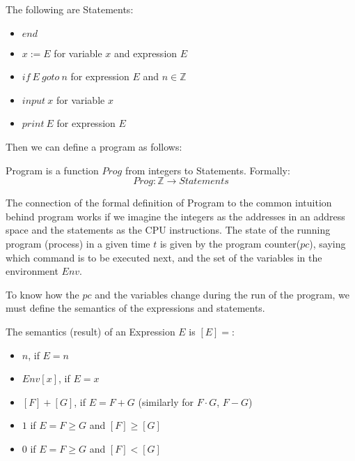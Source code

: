 \begin{defn}[Statement]
    The following are Statements:
    \begin{itemize}
        \item $end$
        \item $x := E$ for variable $x$ and expression $E$
        \item $if \: E \: goto \: n$ for expression $E$ and $n \in \mathbb{Z}$
        \item $input \: x$ for variable $x$
        \item $print \: E$ for expression $E$
    \end{itemize}
\end{defn}

Then we can define a program as follows:

\begin{defn}[Program]
    Program is a function $Prog$ from integers to Statements.
    Formally:
    \[Prog: \mathbb{Z} \rightarrow Statements\]
\end{defn}

The connection of the formal definition of Program to the common intuition behind program works if we imagine the
integers as the addresses in an address space and the statements as the CPU instructions.
The state of the running program (process) in a given time $t$ is given by the program counter($pc$), saying which
command is to be executed next, and the set of the variables in the environment $Env$.

To know how the $pc$ and the variables change during the run of the program, we must define the semantics of the
expressions and statements.

\begin{defn}
    The semantics (result) of an Expression $E$ is $[E]=$:
    \begin{itemize}
        \item $n$, if $E = n$
        \item $Env[x]$, if $E = x$
        \item $[F] + [G]$, if $E = F + G$ (similarly for $F \cdot G$, $F - G$)
        \item $1$ if $E = F \geq G$ and $[F] \geq [G]$
        \item $0$ if $E = F \geq G$ and $[F] < [G]$
    \end{itemize}
\end{defn}

